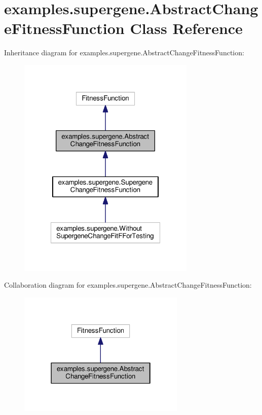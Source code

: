 \hypertarget{classexamples_1_1supergene_1_1_abstract_change_fitness_function}{\section{examples.\-supergene.\-Abstract\-Change\-Fitness\-Function Class Reference}
\label{classexamples_1_1supergene_1_1_abstract_change_fitness_function}
}


Inheritance diagram for examples.\-supergene.\-Abstract\-Change\-Fitness\-Function\-:
\nopagebreak
\begin{figure}[H]
\begin{center}
\leavevmode
\includegraphics[width=240pt]{classexamples_1_1supergene_1_1_abstract_change_fitness_function__inherit__graph}
\end{center}
\end{figure}


Collaboration diagram for examples.\-supergene.\-Abstract\-Change\-Fitness\-Function\-:
\nopagebreak
\begin{figure}[H]
\begin{center}
\leavevmode
\includegraphics[width=226pt]{classexamples_1_1supergene_1_1_abstract_change_fitness_function__coll__graph}
\end{center}
\end{figure}
